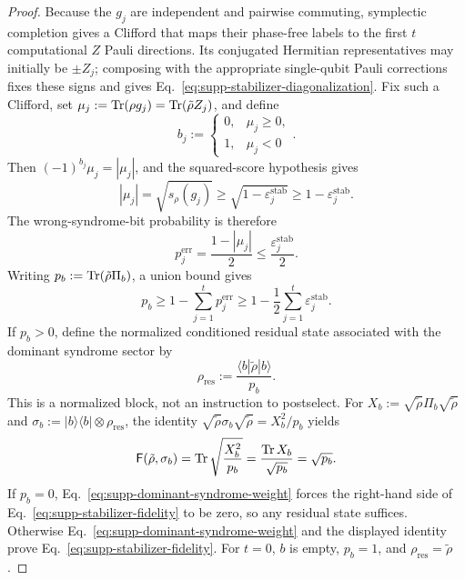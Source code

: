 \documentclass[
  aps,
  prx,
  reprint,
  superscriptaddress,
  amsmath,
  amssymb,
  nofootinbib,
  longbibliography
]{revtex4-2}
\newcommand{\F}{\mathsf{F}}
\begin{document}
\begin{proof}
Because the $g_j$ are independent and pairwise commuting, symplectic
completion gives a Clifford that maps their phase-free labels to the first
$t$ computational $Z$ Pauli directions.  Its conjugated Hermitian representatives may
initially be $\pm Z_j$; composing with the appropriate single-qubit Pauli
corrections fixes these signs and gives
Eq.~\eqref{eq:supp-stabilizer-diagonalization}.  Fix such a Clifford, set
$\mu_j:=\Tr(\rho g_j)=\Tr(\tilde\rho Z_j)$, and define
\begin{equation}
b_j
:=
\begin{cases}
0,&\mu_j\ge0,\\
1,&\mu_j<0
\end{cases}.
\label{eq:supp-deterministic-syndrome-bit}
\end{equation}
Then $(-1)^{b_j}\mu_j=|\mu_j|$, and the squared-score hypothesis gives
\begin{equation}
|\mu_j|
=
\sqrt{s_\rho(g_j)}
\ge
\sqrt{1-\varepsilon_j^{\mathrm{stab}}}
\ge
1-\varepsilon_j^{\mathrm{stab}}.
\label{eq:supp-generator-expectation-magnitude}
\end{equation}
The wrong-syndrome-bit probability is therefore
\begin{equation}
p_j^{\mathrm{err}}
=
\frac{1-|\mu_j|}{2}
\le
\frac{\varepsilon_j^{\mathrm{stab}}}{2}.
\label{eq:supp-incorrect-syndrome-bit}
\end{equation}
Writing $p_b:=\Tr(\tilde\rho\Pi_b)$, a union bound gives
\begin{equation}
p_b
\ge
1-\sum_{j=1}^t p_j^{\mathrm{err}}
\ge
1-\frac12\sum_{j=1}^t\varepsilon_j^{\mathrm{stab}}.
\label{eq:supp-dominant-syndrome-weight}
\end{equation}
If $p_b>0$, define the normalized conditioned residual state associated with
the dominant syndrome sector by
\begin{equation}
\rho_{\mathrm{res}}
:=
\frac{\langle b|\tilde\rho|b\rangle}{p_b}.
\label{eq:supp-conditioned-residual-state}
\end{equation}
This is a normalized block, not an instruction to postselect.  For
$X_b:=\sqrt{\tilde\rho}\Pi_b\sqrt{\tilde\rho}$ and
$\sigma_b:=|b\rangle\!\langle b|\otimes\rho_{\mathrm{res}}$, the identity
$\sqrt{\tilde\rho}\sigma_b\sqrt{\tilde\rho}=X_b^2/p_b$ yields
\begin{equation}
\F(\tilde\rho,\sigma_b)
=
\Tr\sqrt{\frac{X_b^2}{p_b}}
=
\frac{\Tr X_b}{\sqrt{p_b}}
=
\sqrt{p_b}.
\label{eq:supp-conditioned-sector-fidelity}
\end{equation}
If $p_b=0$, Eq.~\eqref{eq:supp-dominant-syndrome-weight} forces the
right-hand side of Eq.~\eqref{eq:supp-stabilizer-fidelity} to be zero, so
any residual state suffices.  Otherwise
Eq.~\eqref{eq:supp-dominant-syndrome-weight} and the displayed identity
prove Eq.~\eqref{eq:supp-stabilizer-fidelity}.  For $t=0$, $b$ is empty,
$p_b=1$, and $\rho_{\mathrm{res}}=\tilde\rho$.
\end{proof}
\end{document}
